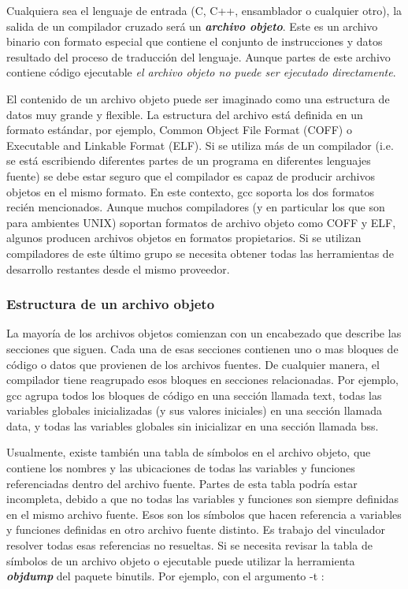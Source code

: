 \documentclass[output=paper, 
colorlinks,
citecolor=brown,
newtxmath
]{langscibook}
\begin{document}
Cualquiera sea el lenguaje de entrada (C, C++, ensamblador o cualquier otro), la salida
de un compilador cruzado será un \textit{\textbf{archivo objeto}}. Este es un archivo binario con
formato especial que contiene el conjunto de instrucciones y datos
resultado del proceso de traducción del lenguaje. Aunque partes de este archivo
contiene código ejecutable \textit{el archivo objeto no puede ser ejecutado directamente}.


El contenido de un archivo objeto puede ser imaginado como una estructura de datos
muy grande y flexible. La estructura del archivo está definida en un formato estándar, 
por ejemplo, Common Object File Format (COFF) o Executable and Linkable Format (ELF).
Si se utiliza más de un compilador (i.e. se está escribiendo diferentes partes de un programa
en diferentes lenguajes fuente) se debe estar seguro que el compilador es capaz
de producir archivos objetos en el mismo formato. En este contexto, gcc soporta 
los dos formatos recién mencionados. Aunque muchos compiladores (y en particular
los que son para ambientes UNIX) soportan formatos de archivo objeto como
COFF y ELF, algunos producen archivos objetos en formatos propietarios.
Si se utilizan compiladores de este último grupo se necesita obtener todas
las herramientas de desarrollo restantes desde el mismo proveedor.

\subsubsection*{Estructura de un archivo objeto}
La mayoría de los archivos objetos comienzan con un encabezado que describe las secciones
que siguen. Cada una de esas secciones contienen uno o mas bloques de código o datos que 
provienen de los archivos fuentes. De cualquier manera, el compilador tiene reagrupado
esos bloques en secciones relacionadas. Por ejemplo, gcc agrupa todos los bloques de
código en una sección llamada text, todas las variables globales inicializadas (y sus
valores iniciales) en una sección llamada data, y todas las variables globales sin 
inicializar en una sección llamada bss.

Usualmente, existe también una tabla de símbolos en el archivo objeto, que contiene
los nombres y las ubicaciones de todas las variables y funciones referenciadas dentro
del archivo fuente. Partes de esta tabla podría estar incompleta, debido a que
no todas las variables y funciones son siempre definidas en el mismo archivo fuente. 
Esos son los símbolos que hacen referencia a variables y funciones definidas en 
otro archivo fuente distinto. Es trabajo del vinculador resolver todas esas referencias
no resueltas. Si se necesita revisar la tabla de símbolos de un archivo objeto
o ejecutable puede utilizar la herramienta \textit{\textbf{objdump}} del paquete binutils.
Por ejemplo, con el argumento -t :
\end{document}
